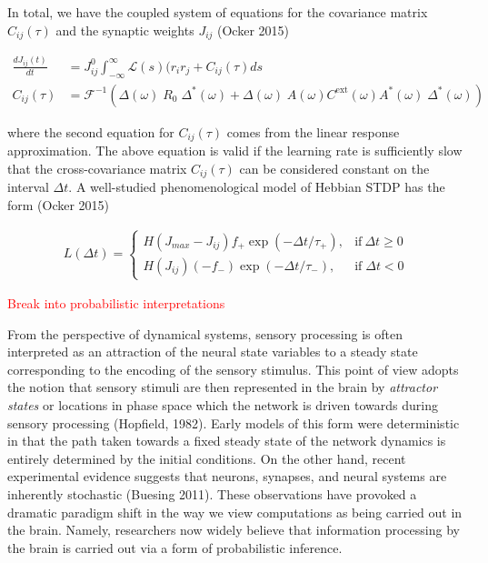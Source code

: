 \documentclass{ucetd}
\begin{document}
In total, we have the coupled system of equations for the covariance matrix $C_{ij}(\tau)$ and the synaptic weights $J_{ij}$ (Ocker 2015)

\begin{align*}
\frac{dJ_{ij}(t)}{dt} &=  J_{ij}^{0}\int_{-\infty}^{\infty} \mathcal{L}(s)(r_{i}r_{j} + C_{ij}(\tau)ds\\
C_{ij}(\tau) &= \mathcal{F}^{-1}\left(\Delta(\omega)\;R_{0}\;\Delta^{*}(\omega) + \Delta(\omega)\;A(\omega)C^{\mathrm{ext}}(\omega)A^{*}(\omega)\;\Delta^{*}(\omega)\right)
\end{align*}

where the second equation for $C_{ij}(\tau)$ comes from the linear response approximation. The above equation is valid if the learning rate is sufficiently slow that the cross-covariance matrix $C_{ij}(\tau)$ can be considered constant on the interval $\Delta t$. A well-studied phenomenological model of Hebbian STDP has the form (Ocker 2015)

\begin{align*}
L(\Delta t) = \begin{cases}
      H(J_{max}-J_{ij})f_{+}\exp(-\Delta t/\tau_{+}), & \text{if}\ \Delta t \geq 0 \\
       H(J_{ij})(-f_{-})\exp(-\Delta t/\tau_{-}), & \text{if} \;\Delta t < 0
    \end{cases}
\end{align*}


\textcolor{red}{Break into probabilistic interpretations}

From the perspective of dynamical systems, sensory processing is often interpreted as an attraction of the neural state variables to a steady state corresponding to the encoding of the sensory stimulus. This point of view adopts the notion that sensory stimuli are then represented in the brain by \emph{attractor states} or locations in phase space which the network is driven towards during sensory processing (Hopfield, 1982). Early models of this form were deterministic in that the path taken towards a fixed steady state of the network dynamics is entirely determined by the initial conditions. On the other hand, recent experimental evidence suggests that neurons, synapses, and neural systems are inherently stochastic (Buesing 2011). These observations have provoked a dramatic paradigm shift in the way we view computations as being carried out in the brain. Namely, researchers now widely believe that information processing by the brain is carried out via a form of probabilistic inference.
\end{document}
